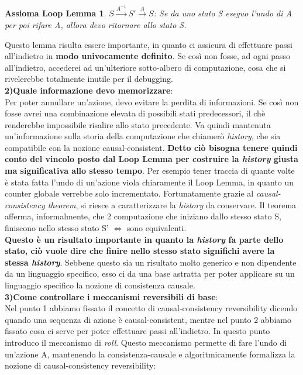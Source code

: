\documentclass[background.tex]{subfiles}
\begin{document}
\newtheorem{ax2}{Assioma Loop Lemma}
	\begin{ax2}
 		$\displaystyle S\xrightarrow{A^{-1}}S'\xrightarrow{A}S$: Se da uno stato S eseguo l'undo di A per poi rifare A, allora devo ritornare allo stato S.
	\end{ax2}
Questo lemma risulta essere importante, in quanto ci assicura di effettuare passi all'indietro in \textbf{modo univocamente definito}. Se così non fosse, ad ogni passo all'indietro, accederei ad un'ulteriore sotto-albero di computazione, cosa che si rivelerebbe totalmente inutile per il debugging.\\
\textbf{2)Quale informazione devo memorizzare}:\\
Per poter annullare un'azione, devo evitare la perdita di informazioni. Se così non fosse avrei una combinazione elevata di possibili stati predecessori, il chè renderebbe impossibile risalire allo stato precedente.
Va quindi mantenuta un'informazione sulla storia della computazione che chiamerò \textit{history}, che sia compatibile con la nozione causal-consistent.
\textbf{Detto ciò bisogna tenere quindi conto del vincolo posto dal Loop Lemma per costruire la \textit{history} giusta ma significativa allo stesso tempo}. Per esempio tener traccia di quante volte è stata fatta l'undo di un'azione viola chiaramente il Loop Lemma, in quanto un counter globale verrebbe solo incrementato. Fortunatamente grazie al \textit{causal-consistency theorem}\cite{causal}, si riesce a caratterizzare la \textit{history} da conservare.
Il teorema afferma, informalmente, che 2 computazione che iniziano dallo stesso stato S, finiscono nello stesso stato S' $\iff$ sono equivalenti.\\
\textbf{Questo è un risultato importante in quanto la \textit{history} fa parte dello stato, ciò vuole dire che finire nello stesso stato significhi avere la stessa \textit{history}}.
Sebbene questo sia un risultato molto generico e non dipendente da un linguaggio specifico, esso ci da una base astratta per poter applicare su un linguaggio specifico la nozione di consistenza causale.\\
\textbf{3)Come controllare i meccanismi reversibili di base}:\\
Nel punto 1 abbiamo fissato il concetto di causal-consistency reversibility dicendo quando una sequenza di azione è causal-consistent, mentre nel punto 2 abbiamo fissato cosa ci serve per poter effettuare passi all'indietro. In questo punto introduco il meccanismo di \textit{roll}.
Questo meccanismo permette di fare l'undo di un'azione A, mantenendo la consistenza-causale e algoritmicamente formalizza la nozione di causal-consistency reversibility:\\
\end{document}
